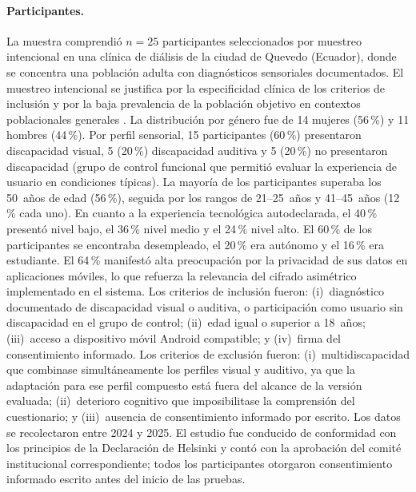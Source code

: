 \documentclass[journal]{IEEEtran}
\begin{document}
	\paragraph{Participantes.} La muestra comprendi\'o $n = 25$ participantes seleccionados por muestreo intencional \cite{hernandez2014} en una cl\'inica de di\'alisis de la ciudad de Quevedo (Ecuador), donde se concentra una poblaci\'on adulta con diagn\'osticos sensoriales documentados. El muestreo intencional se justifica por la especificidad cl\'inica de los criterios de inclusi\'on y por la baja prevalencia de la poblaci\'on objetivo en contextos poblacionales generales \cite{who2011}. La distribuci\'on por g\'enero fue de 14 mujeres (56\,\%) y 11 hombres (44\,\%). Por perfil sensorial, 15 participantes (60\,\%) presentaron discapacidad visual, 5 (20\,\%) discapacidad auditiva y 5 (20\,\%) no presentaron discapacidad (grupo de control funcional que permiti\'o evaluar la experiencia de usuario en condiciones t\'ipicas). La mayor\'ia de los participantes superaba los 50~a\~nos de edad (56\,\%), seguida por los rangos de 21--25~a\~nos y 41--45~a\~nos (12\,\% cada uno). En cuanto a la experiencia tecnol\'ogica autodeclarada, el 40\,\% present\'o nivel bajo, el 36\,\% nivel medio y el 24\,\% nivel alto. El 60\,\% de los participantes se encontraba desempleado, el 20\,\% era aut\'onomo y el 16\,\% era estudiante. El 64\,\% manifest\'o alta preocupaci\'on por la privacidad de sus datos en aplicaciones m\'oviles, lo que refuerza la relevancia del cifrado asim\'etrico implementado en el sistema. Los criterios de inclusi\'on fueron: (i)~diagn\'ostico documentado de discapacidad visual o auditiva, o participaci\'on como usuario sin discapacidad en el grupo de control; (ii)~edad igual o superior a 18~a\~nos; (iii)~acceso a dispositivo m\'ovil Android compatible; y (iv)~firma del consentimiento informado. Los criterios de exclusi\'on fueron: (i)~multidiscapacidad que combinase simult\'aneamente los perfiles visual y auditivo, ya que la adaptaci\'on para ese perfil compuesto est\'a fuera del alcance de la versi\'on evaluada; (ii)~deterioro cognitivo que imposibilitase la comprensi\'on del cuestionario; y (iii)~ausencia de consentimiento informado por escrito. Los datos se recolectaron entre 2024 y 2025. El estudio fue conducido de conformidad con los principios de la Declaraci\'on de Helsinki \cite{world2013} y cont\'o con la aprobaci\'on del comit\'e institucional correspondiente; todos los participantes otorgaron consentimiento informado escrito antes del inicio de las pruebas.
	
\end{document}
